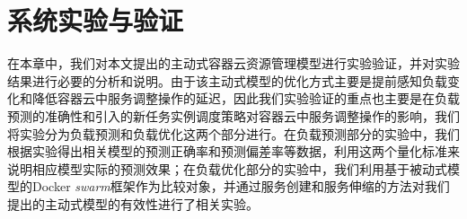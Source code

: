 
\chapter{系统实验与验证}\label{chap:sys_eval}
在本章中，我们对本文提出的主动式容器云资源管理模型进行实验验证，并对实验结果进行必要的分析和说明。由于该主动式模型的优化方式主要是提前感知负载变化和降低容器云中服务调整操作的延迟，因此我们实验验证的重点也主要是在负载预测的准确性和引入的新任务实例调度策略对容器云中服务调整操作的影响，我们将实验分为负载预测和负载优化这两个部分进行。在负载预测部分的实验中，我们根据实验得出相关模型的预测正确率和预测偏差率等数据，利用这两个量化标准来说明相应模型实际的预测效果；在负载优化部分的实验中，我们利用基于被动式模型的Docker \emph{swarm}框架作为比较对象，并通过服务创建和服务伸缩的方法对我们提出的主动式模型的有效性进行了相关实验。

